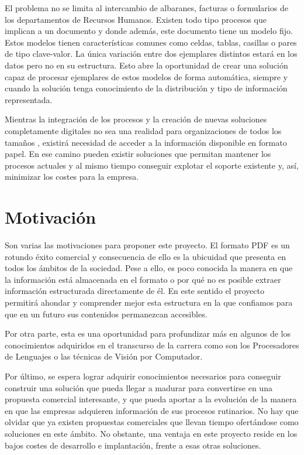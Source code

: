 El problema no se limita al intercambio de albaranes, facturas o formularios de los departamentos de Recursos Humanos. Existen todo tipo procesos que implican a un documento y donde además, este documento tiene un modelo fijo. Estos modelos tienen características comunes como celdas, tablas, casillas o pares de tipo clave-valor. La única variación entre dos ejemplares distintos estará en los datos pero no en su estructura. Esto abre la oportunidad de crear una solución capaz de procesar ejemplares de estos modelos de forma automática, siempre y cuando la solución tenga conocimiento de la distribución y tipo de información representada. 

Mientras la integración de los procesos y la creación de nuevas soluciones completamente digitales \cite{elpais_news_utopiaOficinaSinPapel} no sea una realidad para organizaciones de todos los tamaños \cite{confidencial_news_transformacionOnline}, existirá necesidad de acceder a la información disponible en formato papel. En ese camino pueden existir soluciones que permitan mantener los procesos actuales y al mismo tiempo conseguir explotar el soporte existente y, así, minimizar los costes para la empresa. 

\section{Motivación}

Son varias las motivaciones para proponer este proyecto. El formato PDF es un rotundo éxito comercial y consecuencia de ello es la ubicuidad que presenta en todos los ámbitos de la sociedad. Pese a ello, es poco conocida la manera en que la información está almacenada en el formato o por qué no es posible extraer información estructurada directamente de él. En este sentido el proyecto permitirá ahondar y comprender mejor esta estructura en la que confiamos para que en un futuro sus contenidos permanezcan accesibles.

Por otra parte, esta es una oportunidad para profundizar más en algunos de los conocimientos adquiridos en el transcurso de la carrera como son los Procesadores de Lenguajes o las técnicas de Visión por Computador.

Por último, se espera lograr adquirir conocimientos necesarios para conseguir construir una solución que pueda llegar a madurar para convertirse en una propuesta comercial interesante, y que pueda aportar a la evolución de la manera en que las empresas adquieren información de sus procesos rutinarios. No hay que olvidar que ya existen propuestas comerciales que llevan tiempo ofertándose como soluciones en este ámbito. No obstante, una ventaja en este proyecto reside en los bajos costes de desarrollo e implantación, frente a esas otras soluciones.

